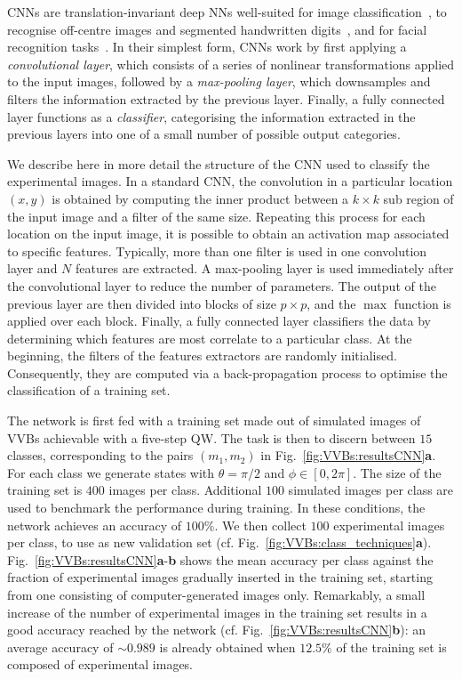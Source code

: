 \acp{CNN} are translation-invariant deep NNs well-suited for image classification~\cite{lecun2015deep}, to recognise off-centre images and segmented handwritten digits~\cite{simard2003best,ciresan2011flexible},
and for facial recognition tasks~\cite{matsugu2003subject}. 
In their simplest form, \acp{CNN} work by first applying a \emph{convolutional layer}, which consists of a series of nonlinear transformations applied to the input images, followed by a \emph{max-pooling layer}, which downsamples and filters the information extracted by the previous layer. Finally, a fully connected layer functions as a \emph{classifier}, categorising the information extracted in the previous layers into one of a small number of possible output categories.

We describe here in more detail the structure of the \ac{CNN} used to classify the experimental images.
In a standard \ac{CNN}, the convolution in a particular location $(x,y)$ is obtained by computing the inner product between a $k \times k$ sub region of the input image and a filter of the same size. Repeating this process for each location on the input image, it is possible to obtain an activation map associated to specific features. Typically, more than one filter is used in one convolution layer and $N$ features are extracted.
A max-pooling layer is used immediately after the convolutional layer to reduce the number of parameters. The output of the previous layer are then divided into blocks of size $p \times p$, and the $\max$ function is applied over each block.
Finally, a fully connected layer classifiers the data by determining which features are most correlate to a particular class.
At the beginning, the filters of the features extractors are randomly initialised. Consequently, they are computed via a back-propagation process to optimise the classification of a training set.

The network is first fed with a training set made out of simulated images of \acp{VVB} achievable with a five-step \ac{QW}.
The task is then to discern between $15$ classes, corresponding to the pairs $(m_1,m_2)$ in Fig.~\ref{fig:VVBs:resultsCNN}\textbf{a}.
For each class we generate states with $\theta=\pi/2$ and $\phi\in[0,2\pi]$. The size of the training set is $400$ images per class. Additional $100$ simulated images per class are used to benchmark the performance during training. In these conditions, the network achieves an accuracy of $100\%$. 
We then collect $100$ experimental images per class, to use as new validation set (cf. Fig.~\ref{fig:VVBs:class_techniques}{\bf a}). Fig.~\ref{fig:VVBs:resultsCNN}{\bf a}-{\bf b} shows the mean accuracy per class against the fraction of experimental images gradually inserted in the training set, starting from one consisting of computer-generated images only.
Remarkably, a small increase of the number of experimental images in the training set results in a good accuracy reached by the network (cf. Fig.~\ref{fig:VVBs:resultsCNN}{\bf b}): an average accuracy of $\sim 0.989$ is already obtained when $12.5\%$ of the training set is composed of experimental images.


